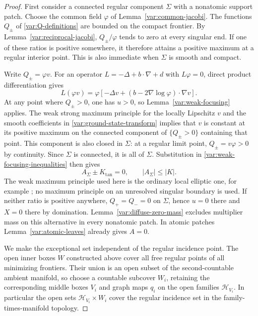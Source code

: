 \begin{proof}
First consider a connected regular component $\Sigma$ with a
nonatomic support patch.  Choose the common field $\varphi$ of
Lemma~\ref{var:common-jacobi}.  The functions $Q_\pm$ of
\eqref{var:Q-definitions} are bounded on the compact frontier.
By Lemma~\ref{var:reciprocal-jacobi},
$Q_\pm/\varphi$ tends to zero at every singular end.  If one of
these ratios is positive somewhere, it therefore attains a
positive maximum at a regular interior point.  This is also
immediate when $\Sigma$ is smooth and compact.

Write $Q_\pm=\varphi v$.  For an operator
$L=-\Delta+b\cdot\nabla+d$ with $L\varphi=0$, direct product
differentiation gives
\begin{equation}\label{var:ground-state-transform}
 L(\varphi v)=\varphi\left[
   -\Delta v+(b-2\nabla\log\varphi)\cdot\nabla v\right].
\end{equation}
At any point where $Q_\pm>0$, one has $u>0$, so
Lemma~\ref{var:weak-focusing} applies.  The weak strong maximum
principle for the locally Lipschitz $v$ and the smooth coefficients
in \eqref{var:ground-state-transform} implies that $v$ is constant
at its positive maximum on the connected component of
$\{Q_\pm>0\}$ containing that point.  This component is also
closed in $\Sigma$: at a regular limit point,
$Q_\pm=v\varphi>0$ by continuity.  Since $\Sigma$ is connected,
it is all of $\Sigma$.  Substitution in
\eqref{var:weak-focusing-inequalities} then gives
\begin{equation}\label{var:sheet-curvature-bound}
 A_\Sigma\pm K_{\mathrm{tan}}=0,
 \qquad |A_\Sigma|\leq |K|.
\end{equation}
The weak maximum principle used here is the ordinary local
elliptic one, for example \cite{GilbargTrudinger2001}; no
maximum principle on an unresolved singular boundary is used.
If neither ratio is positive anywhere, $Q_+=Q_-=0$ on
$\Sigma$, hence $u=0$ there and $X=0$ there by domination.
Lemma~\ref{var:diffuse-zero-mass} excludes multiplier mass on
this alternative in every nonatomic patch.  In atomic patches
Lemma~\ref{var:atomic-leaves} already gives $A=0$.

We make the exceptional set independent of the regular incidence point.
The open inner boxes $W$ constructed above cover all free regular
points of all minimizing frontiers.  Their union is an open subset
of the second-countable ambient manifold, so choose a countable
subcover $W_i$, retaining the corresponding middle boxes $V_i$ and
graph maps $q_i$ on the open families $\mathcal H_{V_i}$.  In
particular the open sets $\mathcal H_{V_i}\times W_i$ cover the
regular incidence set in the family-times-manifold topology.


\end{proof}

